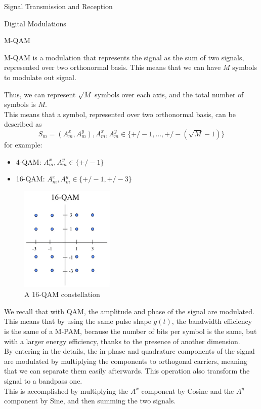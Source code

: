 \begin{section}{Signal Transmission and Reception}
\begin{subsection}{Digital Modulations}
    \begin{subsubsection}{M-QAM}
      \begin{boxH}
        M-QAM is a modulation that represents the signal as the sum of two signals, represented over
        two orthonormal basis. This means that we can have $M$ symbols to modulate out signal.
      \end{boxH}
      Thus, we can represent $\sqrt{M}$ symbols over each axis, and the total number of
      symbols is $M$.\\
      This means that a symbol, represented over two orthonormal basis, can be described as 
      \begin{equation*}
        S_m=(A^x_m,A^y_m),A^x_m,A^y_m \in \{+/-1,\dots,+/-(\sqrt{M}-1)\}
      \end{equation*}
      for example:
      \begin{itemize}
        \item 4-QAM: $A^x_m,A^y_m \in \{+/-1\}$
        \item 16-QAM: $A^x_m,A^y_m \in \{+/-1,+/-3\}$
      \end{itemize}

      \begin{figure}[h]
        \centering
        \includegraphics[width=0.4\textwidth]{img/wireless/16 QAM.png}
        \caption{A 16-QAM constellation}
      \end{figure}

      We recall that with QAM, the amplitude and phase of the signal are modulated. This means that
      by using the same pulse shape $g(t)$, the bandwidth efficiency is the same of a M-PAM, because
      the number of bits per symbol is the same, but with a larger energy efficiency, thanks to the
      presence of another dimension.\\

      By entering in the details, the in-phase and quadrature components of the signal are modulated
      by multiplying the components to orthogonal carriers, meaning that we can separate them 
      easily afterwards. This operation also transform the signal to a bandpass one.\\
      This is accomplished by multiplying the $A^x$ component by Cosine and the $A^y$ component by
      Sine, and then summing the two signals.\\


\end{subsubsection}
\end{subsection}
\end{section}
